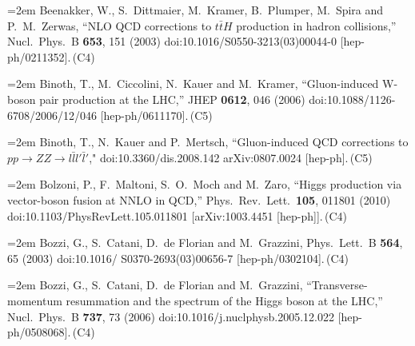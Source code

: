 \documentclass[letter,12pt]{article}
\def\xbibitem#1#2#3{\noindent\hangindent=2em #2\,(#3)}
\begin{document}
  
\xbibitem{Beenakker:2002nc}{Beenakker, W., S.~Dittmaier, M.~Kramer, B.~Plumper, M.~Spira and P.~M.~Zerwas,
  ``NLO QCD corrections to $t\bar tH$ production in hadron collisions,''
  Nucl.\ Phys.\ B {\bf 653}, 151 (2003)
  doi:10.1016/S0550-3213(03)00044-0
  [hep-ph/0211352].}{C4}
  

\xbibitem{Binoth:2006mf}{Binoth, T., M.~Ciccolini, N.~Kauer and M.~Kramer,
  ``Gluon-induced W-boson pair production at the LHC,''
  JHEP {\bf 0612}, 046 (2006)
  doi:10.1088/1126-6708/2006/12/046
  [hep-ph/0611170].}{C5}
  
\xbibitem{Binoth:2008pr}{Binoth, T., N.~Kauer and P.~Mertsch,
  ``Gluon-induced QCD corrections to $pp\to ZZ\to l\bar ll'\bar l'$,"%
  doi:10.3360/dis.2008.142
  arXiv:0807.0024 [hep-ph].}{C5}
  
\xbibitem{Bolzoni:2010xr}{Bolzoni, P., F.~Maltoni, S.~O.~Moch and M.~Zaro,
  ``Higgs production via vector-boson fusion at NNLO in QCD,''
  Phys.\ Rev.\ Lett.\  {\bf 105}, 011801 (2010)
  doi:10.1103/PhysRevLett.105.011801
  [arXiv:1003.4451 [hep-ph]].}{C4}

\xbibitem{Bozzi:2003jy}{Bozzi, G., S.~Catani, D.~de Florian and M.~Grazzini,
  Phys.\ Lett.\ B {\bf 564}, 65 (2003)
  doi:10.1016/ S0370-2693(03)00656-7
  [hep-ph/0302104].}{C4}
  
\xbibitem{Bozzi:2005wk}{Bozzi, G., S.~Catani, D.~de Florian and M.~Grazzini,
  ``Transverse-momentum resummation and the spectrum of the Higgs boson at the LHC,''
  Nucl.\ Phys.\ B {\bf 737}, 73 (2006)
  doi:10.1016/j.nuclphysb.2005.12.022
  [hep-ph/0508068].}{C4}
  
\end{document}
